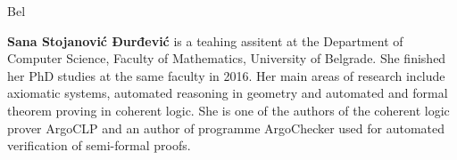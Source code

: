 \begin{sitedescription}{Bel}
\begin{compactitem}
  \item{\bf Sana Stojanović Đurđević} is a teahing assitent at the
    Department of Computer Science, Faculty of Mathematics, University
    of Belgrade. She finished her PhD studies at the same faculty in
    2016.  Her main areas of research include axiomatic systems,
    automated reasoning in geometry and automated and formal theorem
    proving in coherent logic. She is one of the authors of the
    coherent logic prover ArgoCLP and an author of programme ArgoChecker
    used for automated verification of semi-formal proofs.
  \end{compactitem}
    
  
  
\end{sitedescription}

